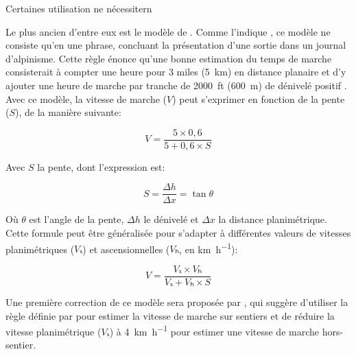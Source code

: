 
Certaines utilisation ne nécessitern

Le plus ancien d'entre eux est le modèle de
\textcite{Naismith1892}. Comme l'indique \textcite{Duchene2019}, ce
modèle ne consiste qu'en une phrase, concluant la présentation d'une
sortie dans un journal d'alpinisme. Cette règle énonce qu'une bonne
estimation du temps de marche consisterait à compter une heure pour 3
miles (\SI{5}{\kilo\meter}) en distance planaire et d'y ajouter une
heure de marche par tranche de \SI{2000}{ft} (\SI{600}{\meter}) de
dénivelé positif \autocite{Naismith1892}. Avec ce modèle, la vitesse
de marche (\(V\)) peut s'exprimer en fonction de la pente (\(S\)), de
la manière suivante:

\begin{equation}
  \label{eq:marche_naismith}
  V = \dfrac{5 × 0,6}{5 + 0,6 × S}
\end{equation}

Avec \(S\) la pente, dont l'expression est:

\begin{equation}
 S = \dfrac{Δh}{Δx} = \tan θ
\end{equation}

Où \(θ\) est l'angle de la pente, \(Δh\) le dénivelé et \(Δx\) la
distance planimétrique. Cette formule peut être généralisée pour
s'adapter à différentes valeurs de vitesses planimétriques (\(Vₓ\)) et
ascensionnelles (\(Vₕ\), en \si{\kilo\meter\per\hour}):

\begin{equation}
  \label{eq:marche_naismith_f}
  V = \dfrac{Vₓ × Vₕ}{Vₓ + Vₕ × S}
\end{equation}

Une première correction de ce modèle sera proposée par
\textcite{Aitken1977}, qui suggère d'utiliser la règle définie par
\autocite{Naismith1892} pour estimer la vitesse de marche sur sentiers
et de réduire la vitesse planimétrique (\(Vₓ\)) à
\SI{4}{\kilo\meter\per\hour} pour estimer une vitesse de marche
hors-sentier.

